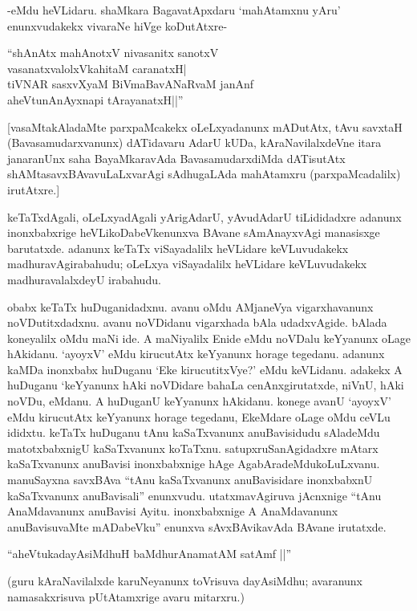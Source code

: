 -eMdu heVLidaru. shaMkara BagavatApxdaru `mahAtamxnu yAru' enunxvudakekx vivaraNe hiVge koDutAtxre-

\begin{shloka}
``shAnAtx mahAnotxV nivasanitx sanotxV\\
vasanatxvalolxVkahitaM caranatxH|\\
tiVNAR sasxvXyaM BiVmaBavANaRvaM janAnf\\
aheVtunA\s nAyxnapi tArayanatxH||''
\end{shloka}

[vasaMtakAladaMte parxpaMcakekx oLeLxyadanunx mADutAtx, tAvu savxtaH (Bavasamudarxvanunx) dATidavaru AdarU kUDa, kAraNavilalxdeVne itara janaranUnx saha BayaMkaravAda BavasamudarxdiMda dATisutAtx shAMtasavxBAvavuLaLxvarAgi sAdhugaLAda mahAtamxru (parxpaMcadalilx) irutAtxre.]

keTaTxdAgali, oLeLxyadAgali yArigAdarU, yAvudAdarU tiLididadxre adanunx inonxbabxrige heVLikoDabeVkenunxva BAvane sAmAnayxvAgi manasisxge barutatxde. adanunx keTaTx viSayadalilx heVLidare keVLuvudakekx madhuravAgirabahudu; oLeLxya viSayadalilx heVLidare keVLuvudakekx madhuravalalxdeyU irabahudu.

obabx keTaTx huDuganidadxnu. avanu oMdu AMjaneVya vigarxhavanunx noVDutitxdadxnu. avanu noVDidanu vigarxhada bAla udadxvAgide. bAlada koneyalilx oMdu maNi ide. A maNiyalilx Enide eMdu noVDalu keYyanunx oLage hAkidanu. `ayoyxV' eMdu kirucutAtx keYyanunx horage tegedanu. adanunx kaMDa inonxbabx huDuganu `Eke kirucutitxVye?' eMdu keVLidanu. adakekx A huDuganu `keYyanunx hAki noVDidare bahaLa cenAnxgirutatxde, niVnU, hAki noVDu, eMdanu. A huDuganU keYyanunx hAkidanu. konege avanU `ayoyxV' eMdu kirucutAtx keYyanunx horage tegedanu, EkeMdare oLage oMdu ceVLu ididxtu. keTaTx huDuganu tAnu kaSaTxvanunx anuBavisidudu sAladeMdu matotxbabxnigU kaSaTxvanunx koTaTxnu. satupxruSanAgidadxre mAtarx kaSaTxvanunx anuBavisi inonxbabxnige hAge AgabAradeMdukoLuLxvanu. manuSayxna savxBAva ``tAnu kaSaTxvanunx anuBavisidare inonxbabxnU kaSaTxvanunx anuBavisali'' enunxvudu. utatxmavAgiruva jAcnxnige ``tAnu AnaMdavanunx anuBavisi Ayitu. inonxbabxnige A AnaMdavanunx anuBavisuvaMte mADabeVku'' enunxva sAvxBAvikavAda BAvane irutatxde. 

\begin{shloka}
``aheVtukadayAsiMdhuH baMdhurAnamatAM satAmf ||''
\end{shloka}

(guru kAraNavilalxde karuNeyanunx toVrisuva dayAsiMdhu; avaranunx namasakxrisuva pUtAtamxrige avaru mitarxru.)


